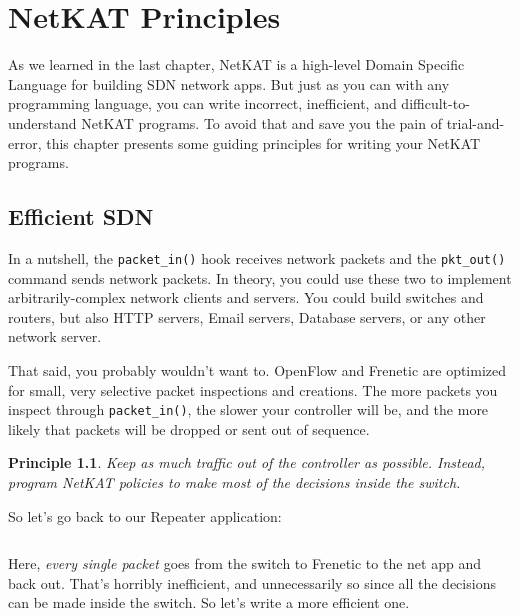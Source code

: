 
\chapter{NetKAT Principles}

As we learned in the last chapter, NetKAT is a high-level Domain Specific Language for building SDN network apps.
But just as you can with any programming language, you can write incorrect, inefficient, and difficult-to-understand
NetKAT programs.
To avoid that and save you the pain of trial-and-error, this chapter presents some guiding principles for writing
your NetKAT programs.  

\newtheorem{principle}{Principle}

\section{Efficient SDN}
\label{netkat_principles:efficient_sdn}

In a nutshell, the \texttt{packet\_in()} hook receives network packets and the \texttt{pkt\_out()} command sends
network packets.  
In theory, you could use these two to implement arbitrarily-complex network clients and servers.  
You could build switches and routers, but also HTTP servers, Email servers, Database servers, or any other 
network server.  

That said, you probably wouldn't want to.
OpenFlow and Frenetic are optimized for small, very selective packet inspections and creations.  
The more packets you inspect through \texttt{packet\_in()}, the slower your controller will be, and
the more likely that packets will be dropped or sent out of sequence.  

\begin{principle}
\label{principle:controller}
Keep as much traffic out of the controller as possible.
Instead, program NetKAT policies to make most of the decisions inside the switch.  
\end{principle}

So let's go back to our Repeater application:

\inputminted{python}{code/quick_start/repeater.py}

Here, \emph{every single packet} goes from the switch to Frenetic to the net app and back out. 
That's horribly inefficient, and unnecessarily so since all the decisions can be made inside the switch.
So let's write a more efficient one.

